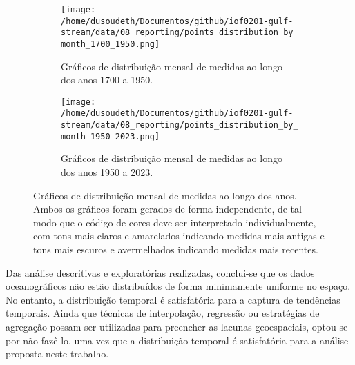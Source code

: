 \documentclass[journal]{IEEEtran}
\begin{document}
            \begin{figure}[ht]
                \centering
                \begin{subfigure}[b]{0.45\linewidth}
                    \texttt{[image: /home/dusoudeth/Documentos/github/iof0201-gulf-stream/data/08\_reporting/points\_distribution\_by\_month\_1700\_1950.png]}
                    \caption{Gráficos de distribuição mensal de medidas ao longo dos anos 1700 a 1950.}
                    \label{fig:img_points_distribution_by_month_1700_1950}
                \end{subfigure}
                \begin{subfigure}[b]{0.45\linewidth}
                    \texttt{[image: /home/dusoudeth/Documentos/github/iof0201-gulf-stream/data/08\_reporting/points\_distribution\_by\_month\_1950\_2023.png]}
                    \caption{Gráficos de distribuição mensal de medidas ao longo dos anos 1950 a 2023.}
                    \label{fig:img_points_distribution_by_month_1950_2023}
                \end{subfigure}
                \caption{Gráficos de distribuição mensal de medidas ao longo dos anos. Ambos os gráficos foram gerados de forma independente, de tal modo que o código de cores deve ser interpretado individualmente, com tons mais claros e amarelados indicando medidas mais antigas e tons mais escuros e avermelhados indicando medidas mais recentes.}
            \end{figure}
            Das análise descritivas e exploratórias realizadas, conclui-se que os dados oceanográficos não estão distribuídos de forma minimamente uniforme no espaço. No entanto, a distribuição temporal é satisfatória para a captura de tendências temporais. Ainda que técnicas de interpolação, regressão ou estratégias de agregação possam ser utilizadas para preencher as lacunas geoespaciais, optou-se por não fazê-lo, uma vez que a distribuição temporal é satisfatória para a análise proposta neste trabalho.
\end{document}

